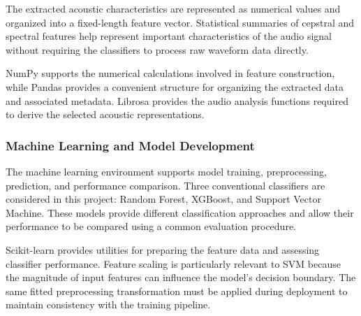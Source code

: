 \documentclass[12pt,a4paper]{report}
\begin{document}
The extracted acoustic characteristics are represented as numerical values and organized into a fixed-length feature vector. Statistical summaries of cepstral and spectral features help represent important characteristics of the audio signal without requiring the classifiers to process raw waveform data directly.

NumPy supports the numerical calculations involved in feature construction, while Pandas provides a convenient structure for organizing the extracted data and associated metadata. Librosa provides the audio analysis functions required to derive the selected acoustic representations.


\subsubsection{Machine Learning and Model Development}

The machine learning environment supports model training, preprocessing, prediction, and performance comparison. Three conventional classifiers are considered in this project: Random Forest, XGBoost, and Support Vector Machine. These models provide different classification approaches and allow their performance to be compared using a common evaluation procedure.

Scikit-learn provides utilities for preparing the feature data and assessing classifier performance. Feature scaling is particularly relevant to SVM because the magnitude of input features can influence the model's decision boundary. The same fitted preprocessing transformation must be applied during deployment to maintain consistency with the training pipeline.
\end{document}
